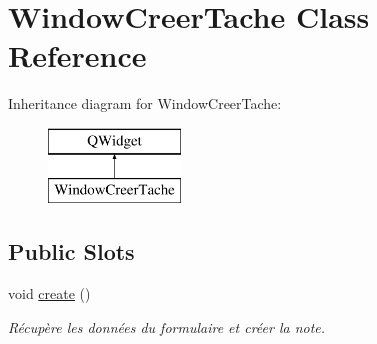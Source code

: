 \hypertarget{class_window_creer_tache}{}\section{Window\+Creer\+Tache Class Reference}
\label{class_window_creer_tache}
Inheritance diagram for Window\+Creer\+Tache\+:\begin{figure}[H]
\begin{center}
\leavevmode
\includegraphics[height=2.000000cm]{class_window_creer_tache}
\end{center}
\end{figure}
\subsection*{Public Slots}
\begin{DoxyCompactItemize}
\item 
\mbox{\label{class_window_creer_tache_ad80f952d0e7fc08674a82ed19e94f178}} 
void \hyperlink{class_window_creer_tache_ad80f952d0e7fc08674a82ed19e94f178}{create} ()
\begin{DoxyCompactList}\small\item\em Récupère les données du formulaire et créer la note. \end{DoxyCompactList}\end{DoxyCompactItemize}
